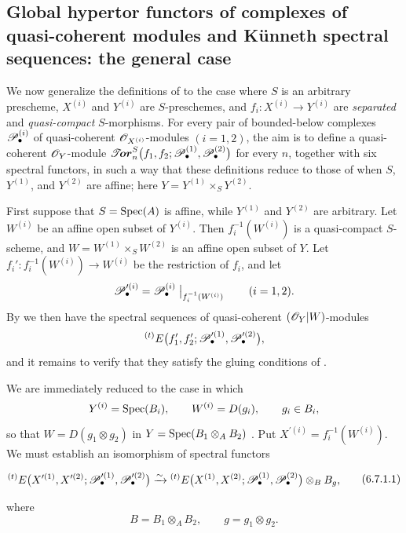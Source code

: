 \subsection{Global hypertor functors of complexes of quasi-coherent modules and K\"unneth spectral sequences: the general case}
\label{subsection:III.6.7}

\begin{env}[6.7.1]
\label{III.6.7.1}
We now generalize the definitions of  to the
case where $S$ is an arbitrary prescheme, $X^{(i)}$ and
$Y^{(i)}$ are $S$-preschemes, and $f_i:X^{(i)}\longrightarrow Y^{(i)}$
are \emph{separated} and \emph{quasi-compact} $S$-morphisms.  For every pair
of bounded-below complexes $\mathscr{P}_\bullet^{(i)}$ of
quasi-coherent $\mathscr{O}_{X^{(i)}}$-modules $(i=1,2)$, the aim is to
define a quasi-coherent $\mathscr{O}_Y$-module $\boldsymbol{\mathscr{T}\!or}_n^S
\bigl(
f_1,f_2;
\mathscr{P}_\bullet^{(1)},\mathscr{P}_\bullet^{(2)}
\bigr)$
for every $n$, together with six spectral functors, in such a way
that these definitions reduce to those of  when
$S$, $Y^{(1)}$, and $Y^{(2)}$ are affine; here
$Y=Y^{(1)}\times_SY^{(2)}$.

First suppose that $S=\operatorname{Spec}(A)$ is affine, while $Y^{(1)}$ and
$Y^{(2)}$ are arbitrary.  Let $W^{(i)}$ be an affine open subset
of $Y^{(i)}$.  Then $f_i^{-1}(W^{(i)})$ is a quasi-compact
$S$-scheme, and $W=W^{(1)}\times_SW^{(2)}$
is an affine open subset of $Y$.  Let $f_i':f_i^{-1}(W^{(i)})\longrightarrow W^{(i)}$
be the restriction of $f_i$, and let
\[
  \mathscr{P}_\bullet^{\prime(i)}
  =
  \mathscr{P}_\bullet^{(i)}
  \bigm|_{f_i^{-1}(W^{(i)})}
  \qquad(i=1,2).
\]
By  we then have the spectral sequences of
quasi-coherent $(\mathscr{O}_Y|W)$-modules
\[
  {}^{(t)}E
  \bigl(
    f_1',f_2';
    \mathscr{P}_\bullet^{\prime(1)},\mathscr{P}_\bullet^{\prime(2)}
  \bigr),
\]
and it remains to verify that they satisfy the gluing conditions
of .

We are immediately reduced to the case in which
\[
  Y^{(i)}=\operatorname{Spec}(B_i),
  \qquad
  W^{(i)}=D(g_i),
  \qquad g_i\in B_i,
\]
so that $W=D(g_1\otimes g_2)$
in $Y=\operatorname{Spec}(B_1\otimes_AB_2)$
.  Put
$X^{\prime(i)}=f_i^{-1}(W^{(i)})$.  We must establish an
isomorphism of spectral functors
\begin{env}[6.7.1.1]
\label{III.6.7.1.1}
\[
\begin{split}
  {}^{(t)}E
  \bigl(
    X^{\prime(1)},X^{\prime(2)};
    \mathscr{P}_\bullet^{\prime(1)},\mathscr{P}_\bullet^{\prime(2)}
  \bigr)
  \xrightarrow{\sim}
  {}^{(t)}E
  \bigl(
    X^{(1)},X^{(2)};
    \mathscr{P}_\bullet^{(1)},\mathscr{P}_\bullet^{(2)}
  \bigr)
  \otimes_BB_g ,
\end{split}
\tag{6.7.1.1}\label{III.6.7.1.1.eq}
\]
\end{env}
where
\[
  B=B_1\otimes_AB_2,
  \qquad
  g=g_1\otimes g_2.
\]


\end{env}
